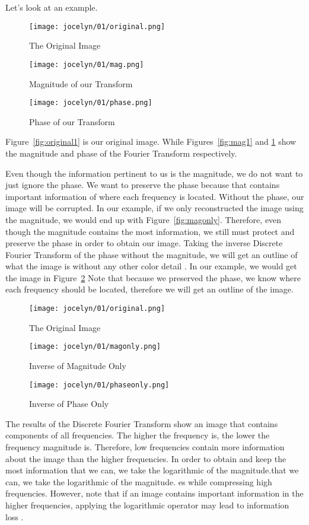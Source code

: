 \documentclass [../article.tex]{subfiles}
\begin{document}
  Let's look at an example.
  \begin{figure}[htbp]
    \texttt{[image: jocelyn/01/original.png]}
    \caption{The Original Image}
    \label{fig:original1}
  \endminipage\hfill
    \texttt{[image: jocelyn/01/mag.png]}
    \caption{Magnitude of our Transform}
    \label{fig:mag1}
  \endminipage\hfill
    \texttt{[image: jocelyn/01/phase.png]}
    \caption{Phase of our Transform}
    \label{fig:phase1}
  \endminipage
  \end{figure}
  Figure~\ref{fig:original1} is our original image. While
  Figures~\ref{fig:mag1} and \ref{fig:phase1} show the
  magnitude and phase of the Fourier Transform respectively.

  Even though the information pertinent to us is the magnitude,
  we do not want to just ignore the phase. We want to preserve
  the phase because that contains important information of where
  each frequency is located. Without the phase, our image will be
  corrupted.  In our example, if we only reconstructed the image
  using the magnitude, we would end up with Figure~\ref{fig:magonly}.
  Therefore, even though the magnitude contains the most
  information, we still must protect and preserve the phase
  in order to obtain our image. Taking the inverse Discrete Fourier
  Transform of the phase without the magnitude, we will get an
  outline of what the image is without any other color detail
  \cite{kundur}. In our example, we would get the image in
  Figure~\ref{fig:phaseonly} Note that because we
  preserved the phase, we know where each frequency should be
  located, therefore we will get an outline of the image.
  \begin{figure}[htbp]
    \texttt{[image: jocelyn/01/original.png]}
    \caption{The Original Image}
    \label{fig:original1_}
  \endminipage\hfill
    \texttt{[image: jocelyn/01/magonly.png]}
    \caption{Inverse of Magnitude Only}
    \label{fig:magonly}
  \endminipage\hfill
    \texttt{[image: jocelyn/01/phaseonly.png]}
    \caption{Inverse of Phase Only}
    \label{fig:phaseonly}
  \endminipage
  \end{figure}

  The results of the Discrete Fourier Transform show an image
  that contains components of all frequencies.  The higher the
  frequency is, the lower the frequency magnitude is.  Therefore,
  low frequencies contain more information about the image than
  the higher frequencies.  In order to obtain and keep the most
  information that we can, we take the logarithmic of the
  magnitude.that we can, we take the logarithmic of the magnitude.
  es while compressing high frequencies.  However, note that if
  an image contains important information in the higher
  frequencies, applying the logarithmic operator may lead
  to information loss \cite{fisher_perkins_walker_wolfart_2003}.
\end{document}
